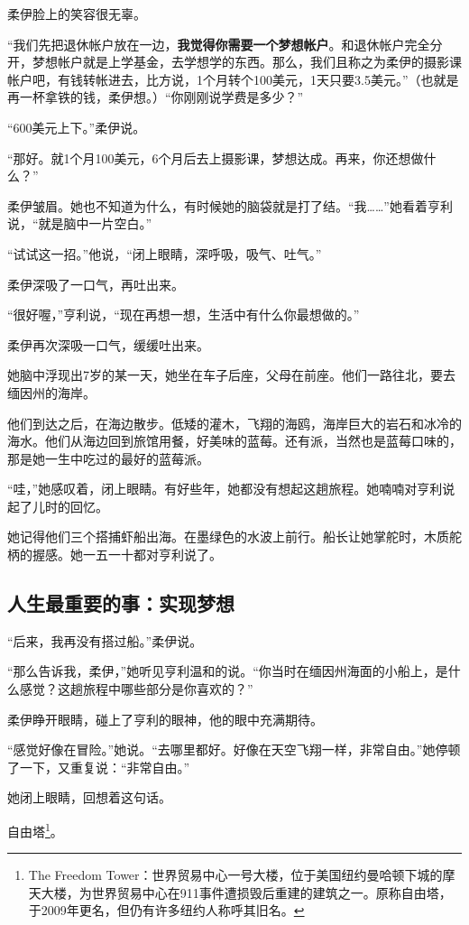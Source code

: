 柔伊脸上的笑容很无辜。

“我们先把退休帐户放在一边，\textbf{我觉得你需要一个梦想帐户}。和退休帐户完全分开，梦想帐户就是上学基金，去学想学的东西。那么，我们且称之为柔伊的摄影课帐户吧，有钱转帐进去，比方说，1个月转个100美元，1天只要3.5美元。”（也就是再一杯拿铁的钱，柔伊想。）“你刚刚说学费是多少？”

“600美元上下。”柔伊说。

“那好。就1个月100美元，6个月后去上摄影课，梦想达成。再来，你还想做什么？”

柔伊皱眉。她也不知道为什么，有时候她的脑袋就是打了结。“我……”她看着亨利说，“就是脑中一片空白。”

“试试这一招。”他说，“闭上眼睛，深呼吸，吸气、吐气。”

柔伊深吸了一口气，再吐出来。

“很好喔，”亨利说，“现在再想一想，生活中有什么你最想做的。”

柔伊再次深吸一口气，缓缓吐出来。

她脑中浮现出7岁的某一天，她坐在车子后座，父母在前座。他们一路往北，要去缅因州的海岸。

他们到达之后，在海边散步。低矮的灌木，飞翔的海鸥，海岸巨大的岩石和冰冷的海水。他们从海边回到旅馆用餐，好美味的蓝莓。还有派，当然也是蓝莓口味的，那是她一生中吃过的最好的蓝莓派。

“哇，”她感叹着，闭上眼睛。有好些年，她都没有想起这趟旅程。她喃喃对亨利说起了儿时的回忆。

她记得他们三个搭捕虾船出海。在墨绿色的水波上前行。船长让她掌舵时，木质舵柄的握感。她一五一十都对亨利说了。

\subsection{人生最重要的事：实现梦想}

“后来，我再没有搭过船。”柔伊说。

“那么告诉我，柔伊，”她听见亨利温和的说。“你当时在缅因州海面的小船上，是什么感觉？这趟旅程中哪些部分是你喜欢的？”

柔伊睁开眼睛，碰上了亨利的眼神，他的眼中充满期待。

“感觉好像在冒险。”她说。“去哪里都好。好像在天空飞翔一样，非常自由。”她停顿了一下，又重复说：“非常自由。”

她闭上眼睛，回想着这句话。

自由塔\footnote{The Freedom Tower：世界贸易中心一号大楼，位于美国纽约曼哈顿下城的摩天大楼，为世界贸易中心在911事件遭损毁后重建的建筑之一。原称自由塔，于2009年更名，但仍有许多纽约人称呼其旧名。}。

